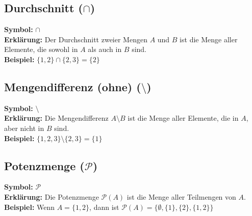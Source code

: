\documentclass[12pt,a4paper]{article}
\begin{document}
\subsection{Durchschnitt (\texorpdfstring{$\cap$}{cap})}
\textbf{Symbol:} $\cap$ \\
\textbf{Erklärung:} Der Durchschnitt zweier Mengen $A$ und $B$ ist die Menge aller Elemente, die sowohl in $A$ als auch in $B$ sind. \\
\textbf{Beispiel:} $\{1,2\} \cap \{2,3\} = \{2\}$
\begin{center}
\end{center}

\subsection{Mengendifferenz (ohne) (\texorpdfstring{$\setminus$}{setminus})}
\textbf{Symbol:} $\setminus$ \\
\textbf{Erklärung:} Die Mengendifferenz $A \setminus B$ ist die Menge aller Elemente, die in $A$, aber nicht in $B$ sind. \\
\textbf{Beispiel:} $\{1,2,3\} \setminus \{2,3\} = \{1\}$
\begin{center}
\end{center}

\subsection{Potenzmenge (\texorpdfstring{$\mathcal{P}$}{P})}
\textbf{Symbol:} $\mathcal{P}$ \\
\textbf{Erklärung:} Die Potenzmenge $\mathcal{P}(A)$ ist die Menge aller Teilmengen von $A$. \\
\textbf{Beispiel:} Wenn $A = \{1,2\}$, dann ist $\mathcal{P}(A) = \{\emptyset, \{1\}, \{2\}, \{1,2\}\}$
\end{document}
